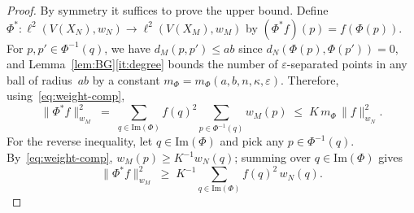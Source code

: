 \documentclass[10pt,reqno]{amsart}
\theoremstyle{remark}
\begin{document}
\begin{proof}
By symmetry it suffices to prove the upper bound. Define $\Phi^*:\ell^2(V(X_N),w_N)\to\ell^2(V(X_M),w_M)$ by
$(\Phi^*f)(p)=f(\Phi(p))$. For
$p,p'\in\Phi^{-1}(q)$, we have $d_M(p,p')\leq ab$ since
$d_N(\Phi(p),\Phi(p'))=0$, and Lemma~\ref{lem:BG}\ref{it:degree} bounds the
number of $\varepsilon$-separated points in any ball of radius~$ab$
by a constant $m_\Phi=m_\Phi(a,b,n,\kappa,\varepsilon)$. Therefore,
using~\eqref{eq:weight-comp},
\begin{equation}
\label{eq:pullback-norm}
  \|\Phi^*f\|_{w_M}^2
  \;=\;\sum_{q\in\mathrm{Im}(\Phi)}f(q)^2\!\sum_{p\in\Phi^{-1}(q)}\!w_M(p)
  \;\leq\;
  K\,m_\Phi\,\|f\|_{w_N}^2.
\end{equation}
For the reverse inequality, let $q\in\mathrm{Im}(\Phi)$ and pick
any $p\in\Phi^{-1}(q)$. By~\eqref{eq:weight-comp},
$w_M(p)\geq K^{-1}w_N(q)$; summing over $q\in\mathrm{Im}(\Phi)$
gives
\begin{equation}
\label{eq:pullback-norm-covered}
  \|\Phi^*f\|_{w_M}^2
  \;\geq\;
  K^{-1}\!\sum_{q\in\mathrm{Im}(\Phi)}f(q)^2\,w_N(q).
\end{equation}


\end{proof}
\end{document}
